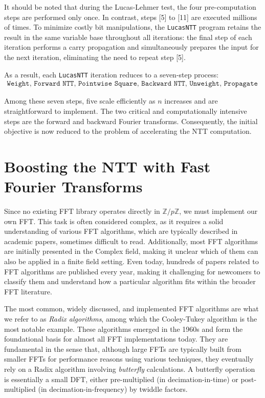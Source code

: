 \documentclass{article}
\begin{document}
It should be noted that during the Lucas-Lehmer test, the four pre-computation steps are performed only once. In contrast, steps [5] to [11] are executed millions of times. To minimize costly bit manipulations, the \texttt{LucasNTT} program retains the result in the same variable base throughout all iterations: the final step of each iteration performs a carry propagation and simultaneously prepares the input for the next iteration, eliminating the need to repeat step [5].

As a result, each \texttt{LucasNTT} iteration reduces to a seven-step process:
\begin{align*}
\label{eq:ll_loop}
\texttt{Weight, Forward NTT, Pointwise Square, Backward NTT, Unweight, Propagate carry, Minus 2}
\end{align*}

Among these seven steps, five scale efficiently as $n$ increases and are straightforward to implement. The two critical and computationally intensive steps are the forward and backward Fourier transforms. Consequently, the initial objective is now reduced to the problem of accelerating the NTT computation.

\section{Boosting the NTT with Fast Fourier Transforms}

Since no existing FFT library operates directly in $\mathbb{Z}/p\mathbb{Z}$, we must implement our own FFT. This task is often considered complex, as it requires a solid understanding of various FFT algorithms, which are typically described in academic papers, sometimes difficult to read. Additionally, most FFT algorithms are initially presented in the Complex field, making it unclear which of them can also be applied in a finite field setting. Even today, hundreds of papers related to FFT algorithms are published every year, making it challenging for newcomers to classify them and understand how a particular algorithm fits within the broader FFT literature.

The most common, widely discussed, and implemented FFT algorithms are what we refer to as \textit{Radix algorithms}, among which the Cooley-Tukey algorithm is the most notable example. These algorithms emerged in the 1960s and form the foundational basis for almost all FFT implementations today. They are fundamental in the sense that, although large FFTs are typically built from smaller FFTs for performance reasons using various techniques, they eventually rely on a Radix algorithm involving \emph{butterfly} calculations. A butterfly operation is essentially a small DFT, either pre-multiplied (in decimation-in-time) or post-multiplied (in decimation-in-frequency) by twiddle factors.
\end{document}
